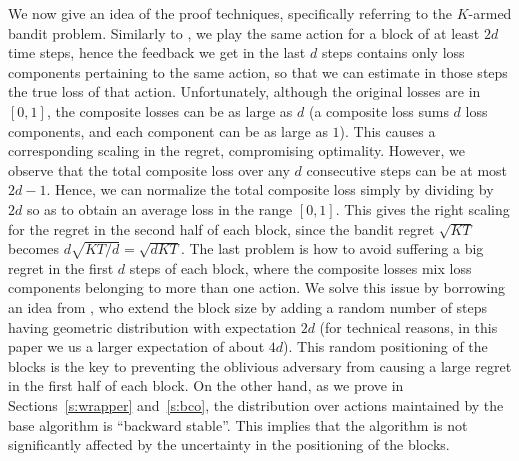 We now give an idea of the proof techniques, specifically referring to the $K$-armed bandit problem.
Similarly to \citep{pike2017bandits}, we play the same action for a block of at least $2d$ time steps, hence the feedback we get in the last $d$ steps contains only loss components pertaining to the same action, so that we can estimate in those steps the true loss of that action. Unfortunately, although the original losses are in $[0,1]$, the composite losses can be as large as $d$ (a composite loss sums $d$ loss components, and each component can be as large as $1$). This causes a corresponding scaling in the regret, compromising optimality. However, we observe that the total composite loss over any $d$ consecutive steps can be at most $2d-1$. Hence, we can normalize the total composite loss simply by dividing by $2d$ so as to obtain an average loss in the range $[0,1]$. This gives the right scaling for the regret in the second half of each block, since the bandit regret $\sqrt{KT}$ becomes $d\sqrt{KT/d}=\sqrt{dKT}$. The last problem is how to avoid suffering a big regret in the first $d$ steps of each block, where the composite losses mix loss components belonging to more than one action. We solve this issue by borrowing an idea from \citet{dhk14}, who extend the block size by adding a random number of steps having geometric distribution with expectation $2d$ (for technical reasons, in this paper we us a larger expectation of about $4d$).
This random positioning of the blocks is the key to preventing the oblivious adversary from causing a large regret in the first half of each block. On the other hand, as we prove in Sections~\ref{s:wrapper} and~\ref{s:bco}, the distribution over actions maintained by the base algorithm is ``backward stable''. This implies that the algorithm is not significantly affected by the uncertainty in the positioning of the blocks.


